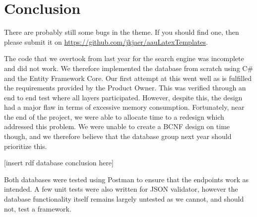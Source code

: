 \chapter{Conclusion}\label{ch:conclusion}
There are probably still some bugs in the theme. If you should find one, then please submit it on \url{https://github.com/jkjaer/aauLatexTemplates}.

The code that we overtook from last year for the search engine was incomplete and did not work.
We therefore implemented the database from scratch using C\# and the Entity Framework Core.
Our first attempt at this went well as is fulfilled the requirements provided by the Product Owner. 
This was verified through an end to end test where all layers participated.
However, despite this, the design had a major flaw in terms of excessive memory consumption. 
Fortunately, near the end of the project, we were able to allocate time to a redesign which addressed this problem.
We were unable to create a BCNF design on time though, and we therefore believe that the database group next year should prioritize this.

[insert rdf database conclusion here]

Both databases were tested using Postman to ensure that the endpoints work as intended.
A few unit tests were also written for JSON validator, however the database functionality itself remains largely untested as we cannot, and should not, test a framework.
